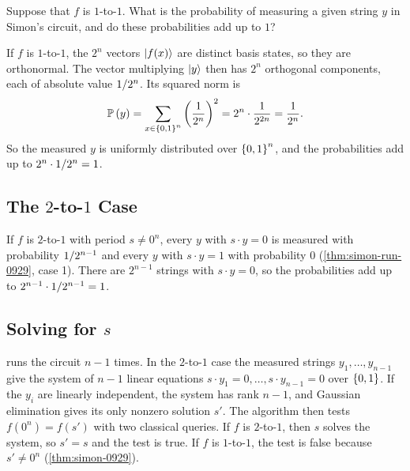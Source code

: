 \begin{exercisebox}
\begin{exercise}\label{ex:simon-11-1001}
    Suppose that $f$ is $1$-to-$1$. What is the probability of measuring a given string $y$ in Simon's
    circuit, and do these probabilities add up to $1$?
\end{exercise}
\tcblower
\begin{wsolution}
    If $f$ is $1$-to-$1$, the $2^n$ vectors $\lvert f(x) \rangle$ are distinct basis states, so they are
    orthonormal. The vector multiplying $\lvert y \rangle$ then has $2^n$ orthogonal components, each of
    absolute value $1/2^n$. Its squared norm is
    \[\prob{y} = \sum_{x \in \set{0,1}^n} \left(\frac{1}{2^n}\right)^2 = 2^n \cdot \frac{1}{2^{2n}} = \frac{1}{2^n}.\]
    So the measured $y$ is uniformly distributed over $\left\lbrace0,1\right\rbrace^n$, and the probabilities add up to
    $2^n \cdot 1/2^n = 1$.
\end{wsolution}
\end{exercisebox}

\subsection{The \texorpdfstring{$2$}{2}-to-\texorpdfstring{$1$}{1} Case}

If $f$ is $2$-to-$1$ with period $s \neq 0^n$, every $y$ with $s \cdot y = 0$ is measured with
probability $1/2^{n-1}$ and every $y$ with $s \cdot y = 1$ with probability $0$
(\cref{thm:simon-run-0929}, case 1). There are $2^{n-1}$ strings with $s \cdot y = 0$, so the
probabilities add up to $2^{n-1} \cdot 1/2^{n-1} = 1$.

\subsection{Solving for \texorpdfstring{$s$}{s}}

 runs the circuit $n - 1$ times. In the $2$-to-$1$ case the measured strings
$y_1, \dots, y_{n-1}$ give the system of $n - 1$ linear equations
$s \cdot y_1 = 0, \dots, s \cdot y_{n-1} = 0$ over $\left\lbrace0,1\right\rbrace$. If the $y_i$ are linearly independent,
the system has rank $n - 1$, and Gaussian elimination gives its only nonzero solution $s'$. The
algorithm then tests $f(0^n) = f(s')$ with two classical queries. If $f$ is $2$-to-$1$, then $s$
solves the system, so $s' = s$ and the test is true. If $f$ is $1$-to-$1$, the test is false because
$s' \neq 0^n$ (\cref{thm:simon-0929}).

